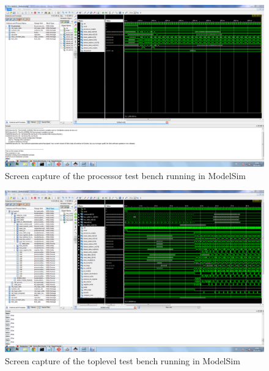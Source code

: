 \begin{figure}
	\begin{center}
		\includegraphics[keepaspectratio, width=\textwidth]{graphics/tb_processor.PNG}
		\caption{Screen capture of the processor test bench running in ModelSim}
		\label{figure:tb-processor}
	\end{center}
\end{figure}

\begin{figure}
	\begin{center}
		\includegraphics[keepaspectratio, width=\textwidth]{graphics/tb_toplevel.PNG}
		\caption{Screen capture of the toplevel test bench running in ModelSim}
		\label{figure:tb-toplevel}
	\end{center}
\end{figure}
